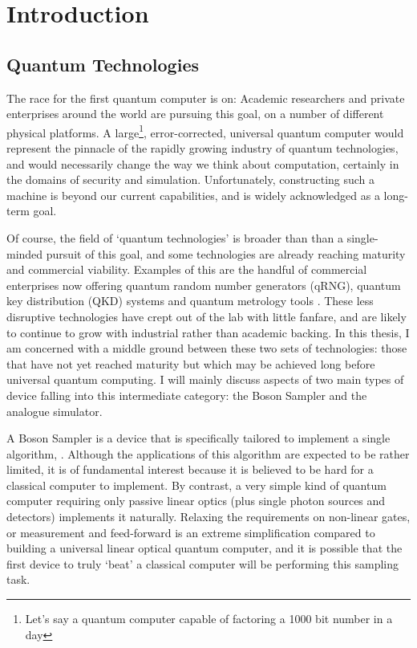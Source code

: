\chapter{Introduction}
\label{ch:Introduction}
\section{Quantum Technologies}
\label{sec:Science}
The race for the first quantum computer is on: Academic researchers and private
enterprises \cite{dwave} around the world are pursuing this goal, on a number of
different physical platforms. A large\footnote{Let's say a quantum computer
capable of factoring a 1000 bit number in a day}, error-corrected, universal
quantum computer would represent the pinnacle of the rapidly growing industry
of quantum technologies, and would necessarily change the way we think about
computation, certainly in the domains of security and simulation. Unfortunately,
constructing such a machine is beyond our current capabilities, and is widely
acknowledged as a long-term goal.

Of course, the field of `quantum technologies' is broader than than a
single-minded pursuit of this goal,
and some technologies are already reaching maturity and
commercial viability. Examples of this are the handful of commercial enterprises
now offering quantum random number generators (qRNG), quantum key distribution
(QKD) systems and quantum metrology tools \cite{idquantique, magiq, qutools}.
These less disruptive technologies have crept out of the lab with little
fanfare, and are likely to continue to grow with industrial rather than
academic backing. In this thesis, I am concerned with a middle ground
between these two sets of technologies: those that have not yet reached maturity
but which may be achieved long before universal quantum computing. I will
mainly discuss aspects of two main types of device falling into this
intermediate category: the Boson Sampler and the analogue simulator. 

A Boson Sampler is a device that is specifically tailored to implement a
single algorithm, \bosonsampling{}. Although the applications of this algorithm
are expected to be rather limited, it is of fundamental interest because it is
believed to be hard for a classical computer to implement. By contrast, a very
simple kind of quantum computer requiring only passive linear optics (plus
single photon sources and detectors) implements it naturally. Relaxing the
requirements on non-linear gates, or measurement and feed-forward is an extreme
simplification compared to building a universal linear optical quantum computer,
and it is possible that the first device to truly `beat' a classical computer
will be performing this sampling task.

